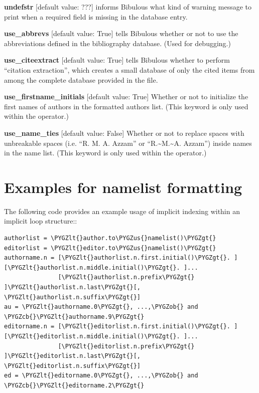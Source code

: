 \documentclass[letterpaper,10pt,english]{sphinxmanual}
\def\PYGZus{\char`\_}
\def\PYGZob{\char`\{}
\def\PYGZcb{\char`\}}
\def\PYGZlt{\char`\<}
\def\PYGZgt{\char`\>}
\begin{document}
\textbf{undefstr} {[}default value: ???{]} informs Bibulous what kind of warning message to print when a required field is missing in the database entry.

\textbf{use\_abbrevs} {[}default value: True{]} tells Bibulous whether or not to use the abbreviations defined in the bibliography database. (Used for debugging.)

\textbf{use\_citeextract} {[}default value: True{]} tells Bibulous whether to perform ``citation extraction'', which creates a small database of only the cited items from among the complete database provided in the  file.

\textbf{use\_firstname\_initials} {[}default value: True{]} Whether or not to initialize the first names of authors in the formatted authors list. (This keyword is only used within the  operator.)

\textbf{use\_name\_ties} {[}default value: False{]} Whether or not to replace spaces with unbreakable spaces (i.e. ``R. M. A. Azzam'' or ``R.\textasciitilde{}M.\textasciitilde{}A. Azzam'') inside names in the name list. (This keyword is only used within the  operator.)


\section{Examples for namelist formatting}
\label{guidelines_for_writing_style_templates:examples-for-namelist-formatting}
The following code provides an example usage of implicit indexing within an implicit loop structure::

\begin{Verbatim}[commandchars=\\\{\}]
authorlist = \PYGZlt{}author.to\PYGZus{}namelist()\PYGZgt{}
editorlist = \PYGZlt{}editor.to\PYGZus{}namelist()\PYGZgt{}
authorname.n = [\PYGZlt{}authorlist.n.first.initial()\PYGZgt{}. ][\PYGZlt{}authorlist.n.middle.initial()\PYGZgt{}. ]...
               [\PYGZlt{}authorlist.n.prefix\PYGZgt{} ]\PYGZlt{}authorlist.n.last\PYGZgt{}[, \PYGZlt{}authorlist.n.suffix\PYGZgt{}]
au = \PYGZlt{}authorname.0\PYGZgt{}, ...,\PYGZob{} and \PYGZcb{}\PYGZlt{}authorname.9\PYGZgt{}
editorname.n = [\PYGZlt{}editorlist.n.first.initial()\PYGZgt{}. ][\PYGZlt{}editorlist.n.middle.initial()\PYGZgt{}. ]...
               [\PYGZlt{}editorlist.n.prefix\PYGZgt{} ]\PYGZlt{}editorlist.n.last\PYGZgt{}[, \PYGZlt{}editorlist.n.suffix\PYGZgt{}]
ed = \PYGZlt{}editorname.0\PYGZgt{}, ...,\PYGZob{} and \PYGZcb{}\PYGZlt{}editorname.2\PYGZgt{}
\end{Verbatim}
\end{document}
